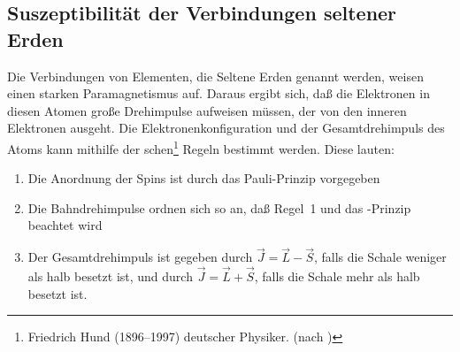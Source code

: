 \subsection{Suszeptibilität der Verbindungen seltener Erden}

Die Verbindungen von Elementen, die Seltene Erden genannt werden, weisen
einen starken Paramagnetismus auf.  Daraus ergibt sich, daß die
Elektronen in diesen Atomen große Drehimpulse aufweisen müssen, der von
den inneren Elektronen ausgeht.  Die Elektronenkonfiguration und der
Gesamtdrehimpuls des Atoms kann mithilfe der
schen\footnote{Friedrich Hund (1896--1997) deutscher
  Physiker. (nach \textcite{wikipedia:friedrich-hund})} Regeln bestimmt
werden. Diese lauten:

\begin{enumerate}
\item Die Anordnung der Spins ist durch das Pauli-Prinzip vorgegeben
\item Die Bahndrehimpulse ordnen sich so an, daß Regel~1 und das
  -Prinzip beachtet wird
\item Der Gesamtdrehimpuls ist gegeben durch $\vec{J} = \vec{L} -
  \vec{S}$, falls die Schale weniger als halb besetzt ist, und durch
  $\vec{J} = \vec{L} + \vec{S}$, falls die Schale mehr als halb besetzt
  ist.
\end{enumerate}
